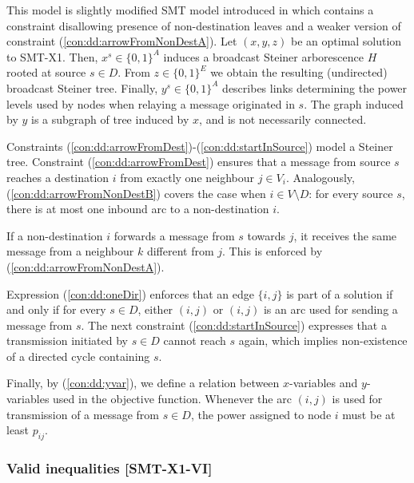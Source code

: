 This model is slightly modified SMT model introduced in \cite{ivanova16isco} which contains a constraint disallowing presence of non-destination leaves and a weaker version of constraint (\ref{con:dd:arrowFromNonDestA}).  
Let $(x,y,z)$ be an optimal solution to SMT-X1. Then, $x^s\in \{0,1\}^{A}$ induces a broadcast Steiner arborescence $H$ rooted at source $s\in D$. From $z\in \{0,1\}^E$ we obtain the resulting (undirected) broadcast Steiner tree. Finally, $y^s\in \{0,1\}^{A}$ describes links determining the power levels used by nodes when relaying a message originated in $s$. The graph induced by $y$ is  a subgraph of tree induced by $x$, and is not necessarily connected.

Constraints (\ref{con:dd:arrowFromDest})-(\ref{con:dd:startInSource}) model a Steiner tree. Constraint (\ref{con:dd:arrowFromDest}) ensures that a message from source $s$ reaches a destination $i$ from exactly one neighbour $j\in V_i$. Analogously, (\ref{con:dd:arrowFromNonDestB}) covers the case when $i \in V\setminus D$: for every source $s$, there is at most one inbound arc to a non-destination $i$. 

If a non-destination $i$ forwards a message from $s$ towards $j$, it receives the same message from a neighbour $k$ different from $j$. This is enforced by (\ref{con:dd:arrowFromNonDestA}). 

Expression (\ref{con:dd:oneDir}) enforces that an edge $\{i,j\}$ is part of a solution if and only if for every $s\in D$, either $(i,j)$ or $(i,j)$ is an arc used for sending a message from $s$. The next constraint (\ref{con:dd:startInSource}) expresses that a transmission initiated by $s\in D$ cannot reach $s$ again, which implies non-existence of a directed cycle containing $s$. 

Finally, by (\ref{con:dd:yvar}), we define a relation between $x$-variables and $y$-variables used in the objective function. Whenever the arc $(i,j)$ is used for transmission of a message from $s\in D$, the power assigned to node $i$ must be at least $p_{ij}$.
\subsubsection{Valid inequalities [SMT-X1-VI]}

